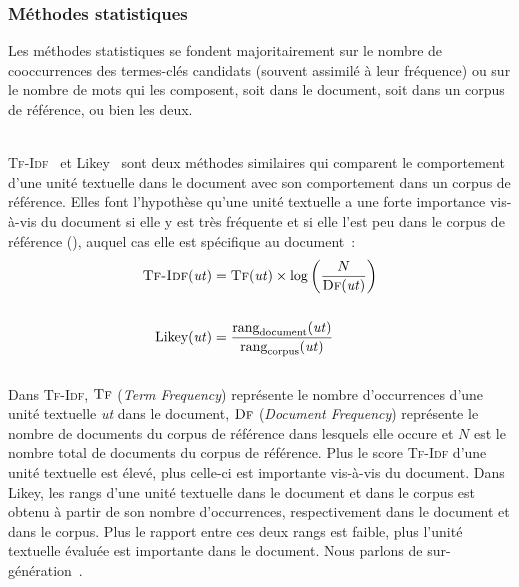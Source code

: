       \subsubsection{Méthodes statistiques}
      \label{subsubsec:main-state_of_the_art-automatic_keyphrase_extraction-unsupervised_keyphrase_extraction-statistical_approaches}
        Les méthodes statistiques se fondent majoritairement sur le nombre de
        cooccurrences des termes-clés candidats (souvent assimilé à leur
        fréquence) ou sur le nombre de mots qui les composent, soit dans le
        document, soit dans un corpus de référence, ou bien les deux.

        ~\\\textsc{Tf-Idf}~\cite{jones1972tfidf} et Likey~\cite{paukkeri2010likey}
        sont deux méthodes similaires qui comparent le comportement d'une unité
        textuelle dans le document avec son comportement dans un corpus de
        référence. Elles font l'hypothèse qu'une unité textuelle a une forte
        importance vis-à-vis du document si elle y est très fréquente et si elle
        l'est peu dans le corpus de référence (), auquel cas elle
        est spécifique au document~:
        \begin{align}
          \text{\textsc{Tf-Idf}}(\text{\textit{ut}}) &= \textsc{Tf}(\text{\textit{ut}}) \times \log\left(\frac{N}{\textsc{Df}(\text{\textit{ut}})}\right) \label{math:tfidf}\\
          \notag\\
          \text{Likey}(\text{\textit{ut}}) &= \frac{\text{rang}_{\text{document}}(\text{\textit{ut}})}{\text{rang}_{\text{corpus}}(\text{\textit{ut}})} \label{math:likey}
        \end{align}\\
        Dans \textsc{Tf-Idf}, $\textsc{Tf}$ (\textit{Term Frequency}) représente
        le nombre d'occurrences d'une unité textuelle \textit{ut} dans le
        document, $\textsc{Df}$ (\textit{Document Frequency}) représente le
        nombre de documents du corpus de référence dans lesquels elle occure
        et $N$ est le nombre total de documents du corpus de référence. Plus le
        score \textsc{Tf-Idf} d'une unité textuelle est élevé, plus celle-ci est
        importante vis-à-vis du document. Dans Likey, les rangs d'une unité
        textuelle dans le document et dans le corpus est obtenu à partir de son
        nombre d'occurrences, respectivement dans le document et dans le corpus.
        Plus le rapport entre ces deux rangs est faible, plus l'unité textuelle
        évaluée est importante dans le document. Nous parlons de
        sur-génération~\cite{hasan2014state_of_the_art}.

